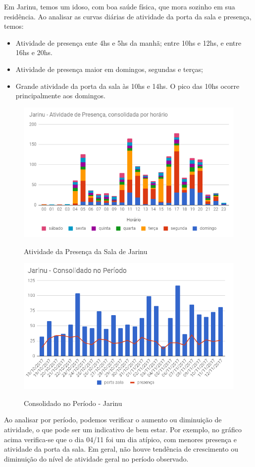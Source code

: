 Em Jarinu, temos um idoso, com boa saúde física, que mora sozinho em sua residência. Ao analisar as curvas diárias de atividade da porta da sala e presença, temos:

\begin{itemize}
	\item Atividade de presença ente 4hs e 5hs da manhã; entre 10hs e 12hs, e entre 16hs e 20hs.
	\item Atividade de presença maior em domingos, segundas e terças;
	\item Grande atividade da porta da sala às 10hs e 14hs. O pico das 10hs ocorre principalmente aos domingos.
\end{itemize}

\begin{figure}[H]
	\centering
	\caption{Atividade da Presença da Sala de Jarinu}
	\includegraphics[width=1.0\textwidth]{AtivPresencaJarinu}
	\label{fig:AtivPresencaJarinu}
\end{figure}

\begin{figure}[H]
	\centering
	\caption{Consolidado no Período - Jarinu}
	\includegraphics[width=1.0\textwidth]{JarinuPeriodo}
	\label{fig:JarinuPeriodo}
\end{figure}

Ao analisar por período, podemos verificar o aumento ou diminuição de atividade, o que pode ser um indicativo de bem estar. Por exemplo, no gráfico acima verifica-se que o dia 04/11 foi um dia atípico, com menores presença e atividade da porta da sala. Em geral, não houve tendência de crescimento ou diminuição do nível de atividade geral no período observado.